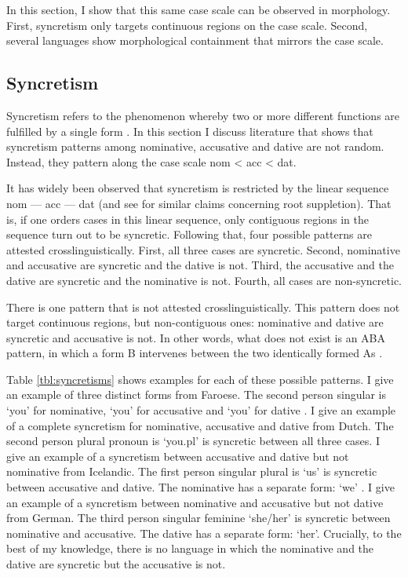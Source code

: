 In this section, I show that this same case scale can be observed in morphology. First, syncretism only targets continuous regions on the case scale. Second, several languages show morphological containment that mirrors the case scale.


\subsection{Syncretism}

Syncretism refers to the phenomenon whereby two or more different functions are fulfilled by a single form \citep[cf.][]{baerman2002}. In this section I discuss literature that shows that syncretism patterns among nominative, accusative and dative are not random. Instead, they pattern along the case scale \ac{nom} < \ac{acc} < \ac{dat}.

It has widely been observed that syncretism is restricted by the linear sequence \ac{nom} --- \ac{acc} --- \ac{dat} \citep{baerman2005,caha2009,zompi2017} (and see \citealt{mcfadden2018,smith2019} for similar claims concerning root suppletion). That is, if one orders cases in this linear sequence, only contiguous regions in the sequence turn out to be syncretic.
Following that, four possible patterns are attested crosslinguistically. First, all three cases are syncretic. Second, nominative and accusative are syncretic and the dative is not. Third, the accusative and the dative are syncretic and the nominative is not. Fourth, all cases are non-syncretic.

There is one pattern that is not attested crosslinguistically. This pattern does not target continuous regions, but non-contiguous ones: nominative and dative are syncretic and accusative is not. In other words, what does not exist is an ABA pattern, in which a form B intervenes between the two identically formed As \citep{bobaljik2012}.

Table \ref{tbl:syncretisms} shows examples for each of these possible patterns.
I give an example of three distinct forms from Faroese. The second person singular is  `you' for nominative,  `you' for accusative and  `you' for dative .
I give an example of a complete syncretism for nominative, accusative and dative from Dutch. The second person plural pronoun is  `you.\ac{pl}' is syncretic between all three cases.
I give an example of a syncretism between accusative and dative but not nominative from Icelandic. The first person singular plural is  `us' is syncretic between accusative and dative. The nominative has a separate form:  `we' .
I give an example of a syncretism between nominative and accusative but not dative from German. The third person singular feminine  `she/her' is syncretic between nominative and accusative. The dative has a separate form:  `her'.
Crucially, to the best of my knowledge, there is no language in which the nominative and the dative are syncretic but the accusative is not.

